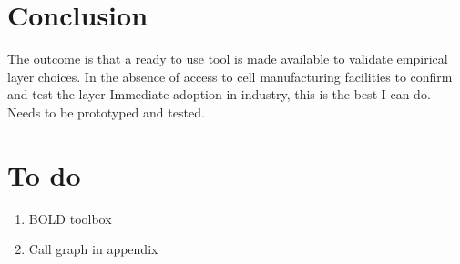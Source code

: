 
\section{Conclusion}

The outcome is that a ready to  use tool is made available to validate empirical
layer choices.  In the  absence of  access to  cell manufacturing  facilities to
confirm and test the  layer Immediate adoption in industry, this  is the best I
can do. Needs to be prototyped and tested.


\section{To do}
\begin{enumerate}
    \item BOLD toolbox
    \item Call graph in appendix
\end{enumerate}

